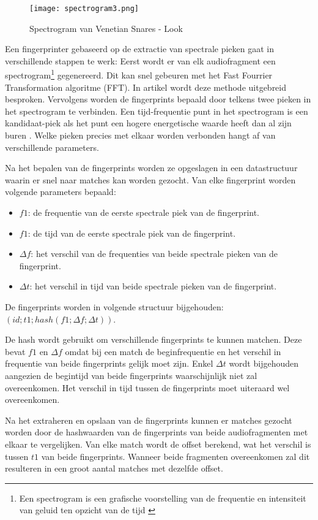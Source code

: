 \begin{figure}[!h]
	\caption{Spectrogram van Venetian Snares - Look}
	\centering
	\texttt{[image: spectrogram3.png]}
\end{figure}

Een fingerprinter gebaseerd op de extractie van spectrale pieken gaat in verschillende stappen te werk: 
Eerst wordt er van elk audiofragment een spectrogram\footnote{Een spectrogram is een grafische voorstelling van de frequentie en intensiteit van geluid ten opzicht van de tijd \cite{spectrogram_dict}} gegenereerd. Dit kan snel gebeuren met het Fast Fourrier Transformation algoritme (FFT). In artikel \cite{oppenheim1970speech} wordt deze methode uitgebreid besproken. Vervolgens worden de fingerprints bepaald door telkens twee pieken in het spectrogram te verbinden. Een tijd-frequentie punt in het spectrogram is een kandidaat-piek als het punt een hogere energetische waarde heeft dan al zijn buren \cite{Wang2003a}. Welke pieken precies met elkaar worden verbonden hangt af van verschillende parameters.

Na het bepalen van de fingerprints worden ze opgeslagen in een datastructuur waarin er snel naar matches kan worden gezocht.
Van elke fingerprint worden volgende parameters bepaald:
\begin{itemize}[noitemsep]
	\item $ f1 $: de frequentie van de eerste spectrale piek van de fingerprint.
	\item $ f1 $: de tijd van de eerste spectrale piek van de fingerprint.
	\item $ \Delta f $: het verschil van de frequenties van beide spectrale pieken van de fingerprint.
	\item $ \Delta t $: het verschil in tijd van beide spectrale pieken van de fingerprint.
\end{itemize}

De fingerprints worden in volgende structuur bijgehouden: $ ( id; t1; hash(f1; \Delta f; \Delta t) ) $.

De hash wordt gebruikt om verschillende fingerprints te kunnen matchen. Deze bevat $ f1 $ en $ \Delta f $ omdat bij een match de beginfrequentie en het verschil in frequentie van beide fingerprints gelijk moet zijn. Enkel $ \Delta t $ wordt bijgehouden aangezien de begintijd van beide fingerprints waarschijnlijk niet zal overeenkomen. Het verschil in tijd tussen de fingerprints moet uiteraard wel overeenkomen.

Na het extraheren en opslaan van de fingerprints kunnen er matches gezocht worden door de hashwaarden van de fingerprints van beide audiofragmenten met elkaar te vergelijken. Van elke match wordt de offset berekend, wat het verschil is tussen $ t1 $ van beide fingerprints. Wanneer beide fragmenten overeenkomen zal dit resulteren in een groot aantal matches met dezelfde offset. 

